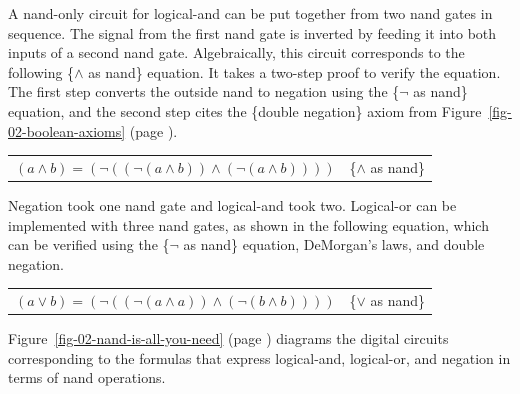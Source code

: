A nand-only circuit for logical-and can be
put
together from two nand gates in sequence.
The signal from the first nand gate is inverted
by feeding it into both inputs of a second nand gate.
Algebraically, this circuit corresponds to the following \{$\wedge$ as nand\} equation.
It takes a two-step proof to verify the equation.
The first step converts the outside nand to negation using the
\{$\neg$ as nand\} equation, and the second step cites
the \{double negation\} axiom from Figure~\ref{fig-02-boolean-axioms}
(page \pageref{fig-02-boolean-axioms}).

\begin{center}
\begin{tabular}{ll}
$(a \wedge b) = (\neg ((\neg (a \wedge b)) \wedge (\neg (a \wedge b))))$ & \{$\wedge$ as nand\}\label{and-as-nand}
\end{tabular}
\end{center}

Negation took one nand gate and
logical-and took two.
Logical-or can be implemented with three nand gates,
as shown in the following equation,
which can be verified using
the \{$\neg$ as nand\} equation, DeMorgan's laws,
and double negation.

\begin{center}
\begin{tabular}{ll}
$(a \vee b) = (\neg ((\neg(a \wedge a)) \wedge (\neg(b \wedge b))))$ & \{$\vee$ as nand\}\label{or-as-nand}
\end{tabular}
\end{center}

Figure~\ref{fig-02-nand-is-all-you-need} (page \pageref{fig-02-nand-is-all-you-need})
diagrams the digital circuits
corresponding to the formulas that express logical-and, logical-or, and negation
in terms of nand operations.

